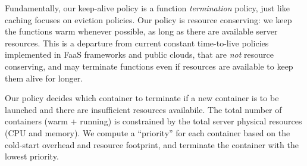 Fundamentally, our keep-alive policy is a function \emph{termination} policy, just like caching focuses on eviction policies.  
Our policy is resource conserving: we keep the functions warm whenever possible, as long as there are available server resources. 
This is a departure from current constant time-to-live policies implemented in FaaS frameworks and public clouds, that are \emph{not} resource conserving, and may terminate functions even if resources are available to keep them alive for longer. 

Our policy decides which container to terminate if a new container is to be launched and there are insufficient resources availabile. 
The total number of containers (warm + running) is constrained by the total server physical resources (CPU and memory). 
We compute a ``priority'' for each container based on the cold-start overhead and resource footprint, and terminate the container with the lowest priority.
%


%
%
%
%

%






